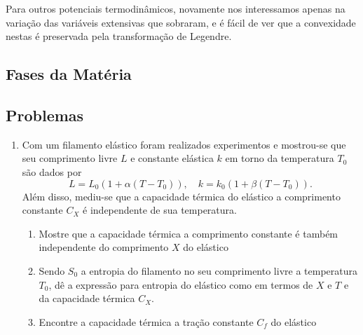 Para outros potenciais termodinâmicos, novamente nos interessamos apenas na
variação das variáveis extensivas que sobraram, e é fácil de ver que a
convexidade nestas é preservada pela transformação de Legendre.

\subsection{Fases da Matéria}

\subsection{Problemas}

\begin{enumerate}
    \item
        Com um filamento elástico foram realizados experimentos e mostrou-se que
        seu comprimento livre $L$ e constante elástica $k$ em torno da
        temperatura $T_0$ são dados por
        $$L=L_0(1+\alpha(T-T_0)),\quad k=k_0(1+\beta(T-T_0)).$$
        Além disso, mediu-se que a capacidade térmica do elástico a comprimento
        constante $C_X$ é independente de sua temperatura.
        \begin{enumerate}
            \item
                Mostre que a capacidade térmica a comprimento constante é também
                independente do comprimento $X$ do elástico
            \item
                Sendo $S_0$ a entropia do filamento no seu comprimento livre a
                temperatura $T_0$, dê a expressão para entropia do elástico como
                em termos de $X$ e $T$ e da capacidade térmica $C_X$.
                \answer{}
            \item
                Encontre a capacidade térmica a tração constante $C_f$ do
                elástico
                \answer{}
        \end{enumerate}
\end{enumerate}
